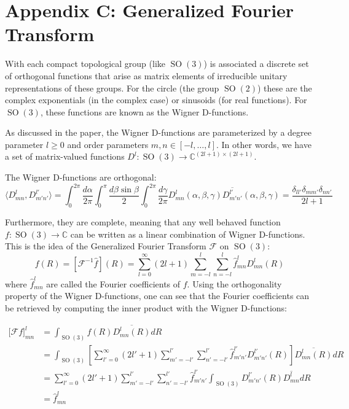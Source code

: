 \documentclass{article} %
\newcommand{\C}{\mathbb{C}}
\newcommand{\SO}[1]{\ensuremath{\operatorname{SO}(#1)}}
\begin{document}
\section*{Appendix C: Generalized Fourier Transform}

With each compact topological group (like $\SO3$) is associated a discrete set of orthogonal functions that arise as matrix elements of irreducible unitary representations of these groups.
For the circle (the group $\SO2$) these are the complex exponentials (in the complex case) or sinusoids (for real functions).
For $\SO3$, these functions are known as the Wigner D-functions.

As discussed in the paper, the Wigner D-functions are parameterized by a degree parameter $l \geq 0$ and order parameters $m, n \in [-l, \ldots, l]$.
In other words, we have a set of matrix-valued functions $D^l : \SO3 \rightarrow \C^{(2l+1) \times (2l+1)}$.

The Wigner D-functions are orthogonal:
\begin{equation}
  \langle D^l_{mn}, D^{l'}_{m'n'} \rangle = \int_0^{2\pi} \frac{d\alpha}{2\pi} \int_0^\pi \frac{d\beta \sin\beta}{2} \int_0^{2\pi} \frac{d\gamma}{2\pi} D^l_{mn}(\alpha, \beta, \gamma) \overline{D^{l'}_{m'n'}}(\alpha, \beta, \gamma)
  = \frac{\delta_{ll'} \delta_{mm'} \delta_{nn'}}{2l+1}
\end{equation}

Furthermore, they are complete, meaning that any well behaved function $f : \SO3 \rightarrow \C$ can be written as a linear combination of Wigner D-functions.
This is the idea of the Generalized Fourier Transform $\mathcal{F}$ on $\SO3$:
\begin{equation}
    f(R) = [\mathcal{F}^{-1} \hat{f}](R) = \sum_{l=0}^\infty (2l+1) \sum_{m = -l}^l \sum_{n=-l}^l \hat{f}^l_{mn} D^l_{mn}(R)
\end{equation}
where $\hat{f}^l_{mn}$ are called the Fourier coefficients of $f$.
Using the orthogonality property of the Wigner D-functions, one can see that the Fourier coefficients can be retrieved by computing the inner product with the Wigner D-functions:

\begin{equation}
  \begin{aligned}
    \lbrack \mathcal{F} f]^l_{mn} &= \int_{\SO3} f(R) \overline{D^l_{mn}(R)} dR \\
    &=
    \int_{\SO3} \left[ \sum_{l'=0}^\infty (2l'+1) \sum_{m' = -l'}^{l'} \sum_{n'=-l'}^{l'} \hat{f}^{l'}_{m'n'} D^{l'}_{m'n'}(R)\right] \overline{D^l_{mn}(R)} dR \\
    &=
    \sum_{l'=0}^\infty (2l'+1) \sum_{m' = -l'}^{l'} \sum_{n'=-l'}^{l'} \hat{f}^{l'}_{m'n'} \int_{\SO3} D^{l'}_{m'n'}(R) \overline{D^l_{mn}} dR \\
    &=
    \hat{f}^l_{mn}
  \end{aligned}
\end{equation}
\end{document}
